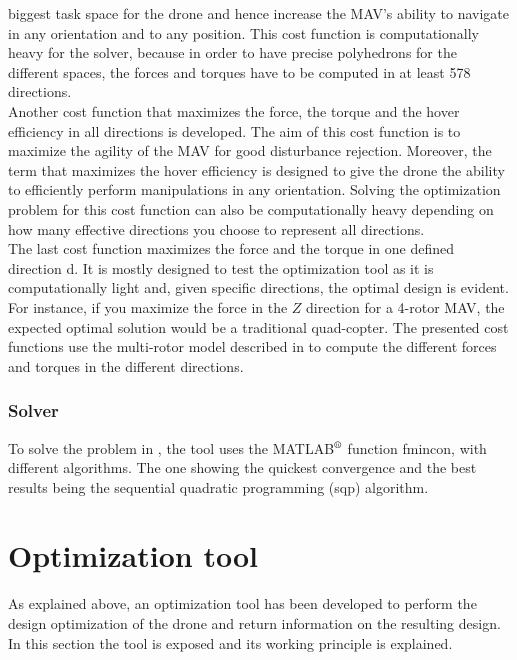 biggest task space for the drone and hence increase the MAV’s ability to navigate
in any orientation and to any position. This cost function is computationally heavy
for the solver, because in order to have precise polyhedrons for the different spaces,
the forces and torques have to be computed in at least 578 directions.\\
Another cost function that maximizes the force, the torque and the hover
efficiency in all directions is developed. The aim of this cost function
is to maximize the agility of the MAV for good disturbance rejection. Moreover,
the term that maximizes the hover efficiency is designed to give the drone
the ability to efficiently perform manipulations in any orientation.
Solving the optimization problem for this cost function can also be computationally
heavy depending on how many effective directions you choose to represent
all directions.\\
The last cost function maximizes the force and the torque in one defined
direction d. It is mostly designed to test the optimization tool as it is
computationally light and, given specific directions, the optimal design is
evident. For instance, if you maximize the force in the $Z$
direction for a 4-rotor MAV, the expected optimal solution would be a traditional
quad-copter.
The presented cost functions use the multi-rotor model described in
 to compute the different forces and torques in the
different directions.

\subsubsection{Solver}
\label{sec:solver}
To solve the problem in , the tool uses the
MATLAB$^\textrm{\textregistered}$ function fmincon, with different algorithms.
The one showing the quickest convergence and the best results being the sequential
quadratic programming (sqp) algorithm.

\section{Optimization tool}
\label{sec:optimization_tool}
As explained above, an optimization tool has been developed to perform
the design optimization of the drone and return information on the resulting design.
In this section the tool is exposed and its working principle is explained.
